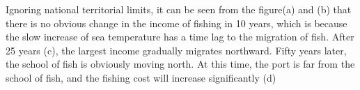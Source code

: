 \documentclass{mcmthesis}
\begin{document}
Ignoring national territorial limits, it can be seen from the figure(a) and (b) that there is no obvious change in the income of fishing in 10 years, which is because the slow increase of sea temperature has a time lag to the migration of fish. After 25 years (c), the largest income gradually migrates northward. Fifty years later, the school of fish is obviously moving north. At this time, the port is far from the school of fish, and the fishing cost will increase significantly (d)

\begin{figure}[htbp]
  \centering



\end{figure}
\end{document}
